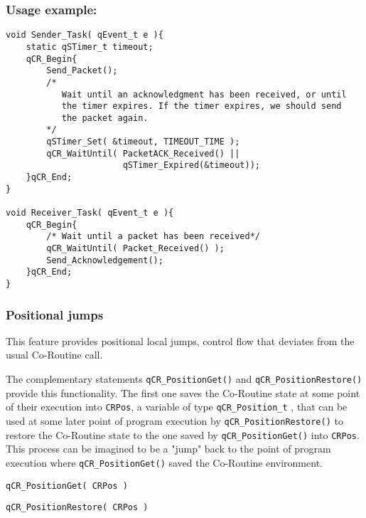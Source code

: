 \subsubsection*{Usage example:}
\begin{lstlisting}[style=CStyle]
void Sender_Task( qEvent_t e ){
    static qSTimer_t timeout;
    qCR_Begin{                  
        Send_Packet();
        /* 
           Wait until an acknowledgment has been received, or until
           the timer expires. If the timer expires, we should send
           the packet again. 
        */
        qSTimer_Set( &timeout, TIMEOUT_TIME );
        qCR_WaitUntil( PacketACK_Received() || 
                       qSTimer_Expired(&timeout));
    }qCR_End;
}

void Receiver_Task( qEvent_t e ){
    qCR_Begin{                  
        /* Wait until a packet has been received*/
        qCR_WaitUntil( Packet_Received() );
        Send_Acknowledgement();  
    }qCR_End;
}
\end{lstlisting} 

\subsubsection{Positional jumps}
This feature provides positional local jumps, control flow that deviates from the usual Co-Routine call. 

The complementary statements \lstinline{qCR_PositionGet()}  and \lstinline{qCR_PositionRestore()}  provide this functionality.
The first one saves the Co-Routine state at some point of their execution into \lstinline{CRPos}, a variable of type \lstinline{qCR_Position_t} ,  that can be used at some later point of program execution by \lstinline{qCR_PositionRestore()} to restore the Co-Routine  state to the one saved by \lstinline{qCR_PositionGet()} into \lstinline{CRPos}. This process can be imagined to be a "jump" back to the point of program execution where \lstinline{qCR_PositionGet()} saved the Co-Routine  environment. \\

\begin{lstlisting}[style=CStyle]
qCR_PositionGet( CRPos )
\end{lstlisting}

\begin{lstlisting}[style=CStyle]
qCR_PositionRestore( CRPos )
\end{lstlisting}

